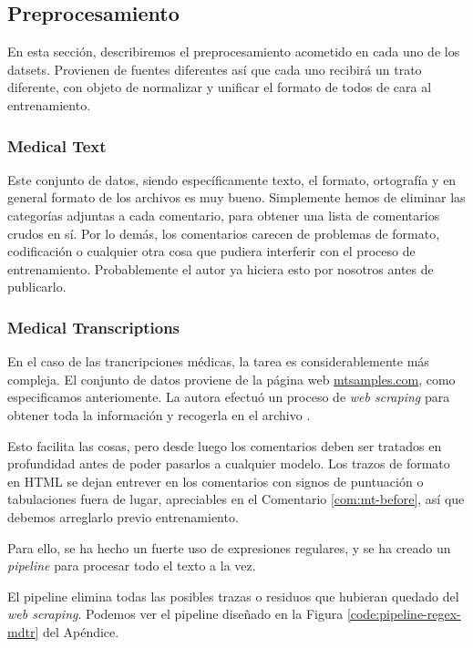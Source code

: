 \subsection{Preprocesamiento}
En esta sección, describiremos el preprocesamiento acometido en cada uno de los datsets. Provienen de fuentes diferentes así que cada uno recibirá un trato diferente, con objeto de normalizar y unificar el formato de todos de cara al entrenamiento.




\subsubsection{Medical Text}
Este conjunto de datos, siendo específicamente texto, el formato, ortografía y en general formato de los archivos es muy bueno. Simplemente hemos de eliminar las categorías adjuntas a cada comentario, para obtener una lista de comentarios crudos en sí. Por lo demás, los comentarios carecen de problemas de formato, codificación o cualquier otra cosa que pudiera interferir con el proceso de entrenamiento. Probablemente el autor ya hiciera esto por nosotros antes de publicarlo.


\subsubsection{Medical Transcriptions}
En el caso de las trancripciones médicas, la tarea es considerablemente más compleja. El conjunto de datos proviene de la página web \url{mtsamples.com}, como especificamos anteriomente. La autora efectuó un proceso de \textit{web scraping} para obtener toda la información y recogerla en el archivo . 

Esto facilita las cosas, pero desde luego los comentarios deben ser tratados en profundidad antes de poder pasarlos a cualquier modelo. Los trazos de formato en HTML se dejan entrever en los comentarios con signos de puntuación o tabulaciones fuera de lugar, apreciables en el Comentario \ref{com:mt-before}, así que debemos arreglarlo previo entrenamiento.

Para ello, se ha hecho un fuerte uso de expresiones regulares, y se ha creado un \textit{pipeline} para procesar todo el texto a la vez.

El pipeline elimina todas las posibles trazas o residuos que hubieran quedado del \textit{web scraping}. Podemos ver el pipeline diseñado en la Figura \ref{code:pipeline-regex-mdtr} del Apéndice.

